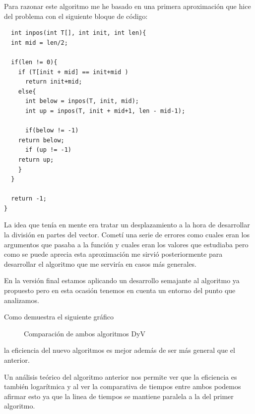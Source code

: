 \documentclass{article}
\begin{document}
Para razonar este algoritmo me he basado en una primera aproximación
que hice del problema con el siguiente bloque de código:

\begin{lstlisting}
  int inpos(int T[], int init, int len){
  int mid = len/2;
  
  if(len != 0){
    if (T[init + mid] == init+mid )
      return init+mid;
    else{
      int below = inpos(T, init, mid);
      int up = inpos(T, init + mid+1, len - mid-1);

      if(below != -1)
	return below;
      if (up != -1)
	return up;	  
    }
  }

  return -1;
}
\end{lstlisting}

La idea que tenía en mente era tratar un desplazamiento a la hora de
desarrollar la división en partes del vector. Cometí una serie de
errores como cuales eran los argumentos que pasaba a la función y
cuales eran los valores que estudiaba pero como se puede aprecia esta
aproximación me sirvió posteriormente para desarrollar el algoritmo
que me serviría en casos más generales.

En la versión final estamos aplicando un desarrollo semajante al
algoritmo ya propuesto pero en esta ocasión tenemos en cuenta un
entorno del punto que analizamos.

Como demuestra el siguiente gráfico

\begin{figure}[H]
  \centering   

\caption{Comparación de ambos algoritmos DyV}
\end{figure}

la eficiencia del nuevo algoritmos es mejor además de ser más general
que el anterior.

Un análisis teórico del algoritmo anterior nos permite ver que la
eficiencia es también logarítmica y al ver la comparativa de tiempos
entre ambos podemos afirmar esto ya que la linea de tiempos se
mantiene paralela a la del primer algoritmo.
\end{document}
